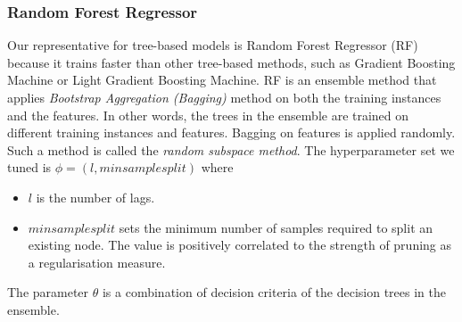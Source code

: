 \subsubsection{Random Forest Regressor}
Our representative for tree-based models is Random Forest Regressor (RF) because it trains faster than other tree-based methods, such as Gradient Boosting Machine or Light Gradient Boosting Machine. RF is an ensemble method that applies \textit{Bootstrap Aggregation (Bagging)} method on both the training instances and the features. In other words, the trees in the ensemble are trained on different training instances and features. Bagging on features is applied randomly. Such a method is called the \textit{random subspace method}. The hyperparameter set we tuned is $\phi = (l, min sample split)$ where
\begin{itemize}
    \item $l$ is the number of lags.
    \item $min sample split$ sets the minimum number of samples required to split an existing node. The value is positively correlated to the strength of pruning as a regularisation measure.
\end{itemize}
The parameter $\theta$ is a combination of decision criteria of the decision trees in the ensemble.

